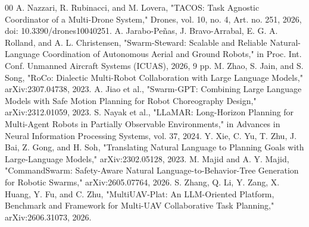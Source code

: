 \documentclass[conference]{IEEEtran}
\begin{document}
\begin{thebibliography}{00}
 A. Nazzari, R. Rubinacci, and M. Lovera, "TACOS: Task Agnostic Coordinator of a Multi-Drone System," Drones, vol. 10, no. 4, Art. no. 251, 2026, doi: 10.3390/drones10040251.
 A. Jarabo-Peñas, J. Bravo-Arrabal, E. G. A. Rolland, and A. L. Christensen, "Swarm-Steward: Scalable and Reliable Natural-Language Coordination of Autonomous Aerial and Ground Robots," in Proc. Int. Conf. Unmanned Aircraft Systems (ICUAS), 2026, 9 pp.
 M. Zhao, S. Jain, and S. Song, "RoCo: Dialectic Multi-Robot Collaboration with Large Language Models," arXiv:2307.04738, 2023.
 A. Jiao et al., "Swarm-GPT: Combining Large Language Models with Safe Motion Planning for Robot Choreography Design," arXiv:2312.01059, 2023.
 S. Nayak et al., "LLaMAR: Long-Horizon Planning for Multi-Agent Robots in Partially Observable Environments," in Advances in Neural Information Processing Systems, vol. 37, 2024.
 Y. Xie, C. Yu, T. Zhu, J. Bai, Z. Gong, and H. Soh, "Translating Natural Language to Planning Goals with Large-Language Models," arXiv:2302.05128, 2023.
 M. Majid and A. Y. Majid, "CommandSwarm: Safety-Aware Natural Language-to-Behavior-Tree Generation for Robotic Swarms," arXiv:2605.07764, 2026.
 S. Zhang, Q. Li, Y. Zang, X. Huang, Y. Fu, and C. Zhu, "MultiUAV-Plat: An LLM-Oriented Platform, Benchmark and Framework for Multi-UAV Collaborative Task Planning," arXiv:2606.31073, 2026.
\end{thebibliography}
\end{document}
